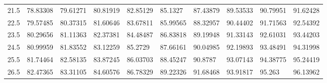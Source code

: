 \documentclass[10pt,twocolumn,letterpaper]{article}
\begin{document}
\begin{table}
\begin{tabular}{llllllllll}
    21.5            & 78.83308                               & 79.61271                               & 80.81919                                & 82.85129                                & 85.1327                                 & 87.43879                                & 89.53533                                & 90.79951                                & 91.62428                                \\
    22.5            & 79.57485                               & 80.37315                               & 81.60646                                & 83.67811                                & 85.99565                                & 88.32957                                & 90.44402                                & 91.71563                                & 92.54392                                \\
    23.5            & 80.29656                               & 81.11363                               & 82.37381                                & 84.48487                                & 86.83818                                & 89.19948                                & 91.33143                                & 92.61031                                & 93.44203                                \\
    24.5            & 80.99959                               & 81.83552                               & 83.12259                                & 85.2729                                 & 87.66161                                & 90.04985                                & 92.19893                                & 93.48491                                & 94.31998                                \\
    25.5            & 81.74464                               & 82.58135                               & 83.87245                                & 86.03703                                & 88.45247                                & 90.8787                                 & 93.07143                                & 94.38775                                & 95.24419                                \\
    26.5            & 82.47365                               & 83.31105                               & 84.60576                                & 86.78329                                & 89.22326                                & 91.68468                                & 93.91817                                & 95.263                                  & 96.13962                                \\

\end{tabular}
\end{table}
\end{document}
